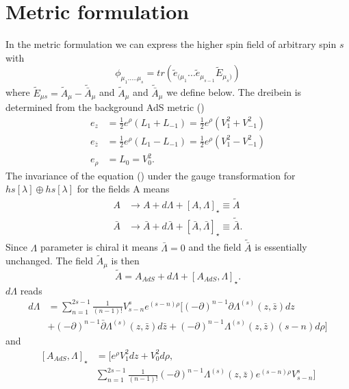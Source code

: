 \documentclass[prd,superscriptaddress,twocolumn,10pt]{revtex4}
\begin{document}
\section{Metric formulation}
In the metric formulation we can express the higher spin field of arbitrary spin $s$ with
\begin{equation}
\phi_{\mu_1.....\mu_s}=tr\left( \tilde{e}_{(\mu_1}...\tilde{e}_{\mu_{s-1}}\tilde{E}_{\mu_s)} \right)
\end{equation}
where $\tilde{E}_{\mu s}=\tilde{A}_{\mu}-\tilde{\bar{A}}_{\mu}$ and $\tilde{A}_{\mu}$ and $\tilde{\bar{A}}_{\mu}$ we define below. 
The  dreibein is determined from the background AdS metric ()
\begin{align}
e_{z}&=\frac{1}{2}e^{\rho}(L_1+L_{-1})=\frac{1}{2}e^{\rho}(V_1^2+V_{-1}^{2}) \\
e_{\bar{z}}&=\frac{1}{2}e^{\rho}(L_1-L_{-1})=\frac{1}{2}e^{\rho}(V_1^2-V_{-1}^2) \\
e_{\rho}&=L_0=V_0^2.
\end{align}
The invariance of the equation () under the gauge transformation for $hs[\lambda]\oplus hs[\lambda]$ for the fields A means 
\begin{align}
A&\rightarrow A+d \Lambda +\left[A,\Lambda \right]_{\star}\equiv \tilde{A}\\
\bar{A}&\rightarrow \bar{A}+d \bar{\Lambda} +\left[\bar{A},\bar{\Lambda} \right]_{\star}\equiv \tilde{\bar{A}}.
\end{align}
Since $\Lambda$ parameter is chiral it means $\bar{\Lambda}=0$ and the field $\tilde{\bar{A}}$ is essentially unchanged. The field $\tilde{A}_{\mu}$ is then  
\begin{equation}
\tilde{A}=A_{AdS}+d\Lambda+\left[A_{AdS},\Lambda\right]_{\star}.
\end{equation}
 $d\Lambda$  reads
\small
\begin{align}
d\Lambda&=\sum_{n=1}^{2s-1}\frac{1}{(n-1)!}V_{s-n}^se^{(s-n)\rho}[ (-\partial)^{n-1}\partial\Lambda^{(s)}(z,\bar{z}) dz\\&+(-\partial)^{n-1}\bar{\partial}\Lambda^{(s)}(z,\bar{z})d\bar{z}+(-\partial)^{n-1}\Lambda^{(s)}(z,\bar{z})(s-n)d\rho ] 
\end{align}
\normalsize
and 
\begin{align}
\left[A_{AdS},\Lambda\right]_{\star}&= [ e^{\rho}V_1^2dz+V_0^2d\rho,\nonumber\\ &\sum_{n=1}^{2s-1}\frac{1}{(n-1)!}(-\partial)^{n-1}\Lambda^{(s)}(z,\bar{z})e^{(s-n)\rho}V^s_{s-n} ]
\end{align}
\end{document}
